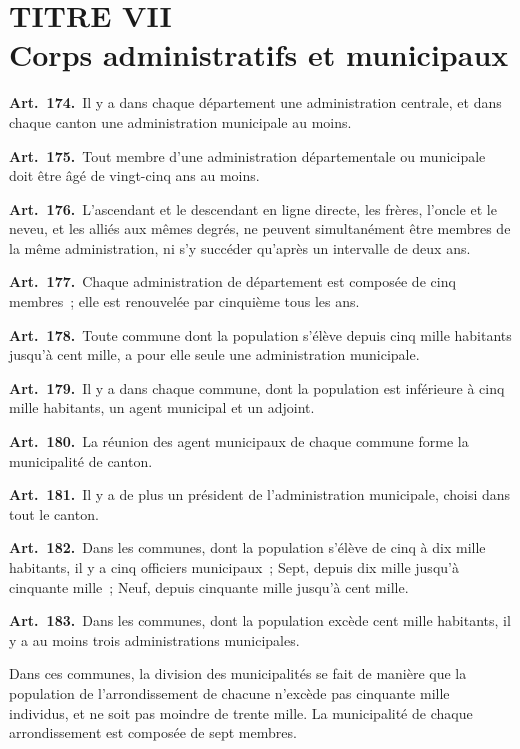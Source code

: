 \documentclass[french,twoside]{book} %
\newcommand{\labelchar}[1]{\textbf{\color{rubric} #1}}
\begin{document}
\section[{TITRE VII. Corps administratifs et municipaux}]{TITRE VII \\
Corps administratifs et municipaux}

\labelchar{Art. 174.} Il y a dans chaque département une administration centrale, et dans chaque canton une administration municipale au moins.\par
\labelchar{Art. 175.} Tout membre d’une administration départementale ou municipale doit être âgé de vingt-cinq ans au moins.\par
\labelchar{Art. 176.} L’ascendant et le descendant en ligne directe, les frères, l’oncle et le neveu, et les alliés aux mêmes degrés, ne peuvent simultanément être membres de la même administration, ni s’y succéder qu’après un intervalle de deux ans.\par
\labelchar{Art. 177.} Chaque administration de département est composée de cinq membres ; elle est renouvelée par cinquième tous les ans.\par
\labelchar{Art. 178.} Toute commune dont la population s’élève depuis cinq mille habitants jusqu’à cent mille, a pour elle seule une administration municipale.\par
\labelchar{Art. 179.} Il y a dans chaque commune, dont la population est inférieure à cinq mille habitants, un agent municipal et un adjoint.\par
\labelchar{Art. 180.} La réunion des agent municipaux de chaque commune forme la municipalité de canton.\par
\labelchar{Art. 181.} Il y a de plus un président de l’administration municipale, choisi dans tout le canton.\par
\labelchar{Art. 182.} Dans les communes, dont la population s’élève de cinq à dix mille habitants, il y a cinq officiers municipaux ; Sept, depuis dix mille jusqu’à cinquante mille ; Neuf, depuis cinquante mille jusqu’à cent mille.\par
\labelchar{Art. 183.} Dans les communes, dont la population excède cent mille habitants, il y a au moins trois administrations municipales.\par
Dans ces communes, la division des municipalités se fait de manière que la population de l’arrondissement de chacune n’excède pas cinquante mille individus, et ne soit pas moindre de trente mille. La municipalité de chaque arrondissement est composée de sept membres.\par
\end{document}
